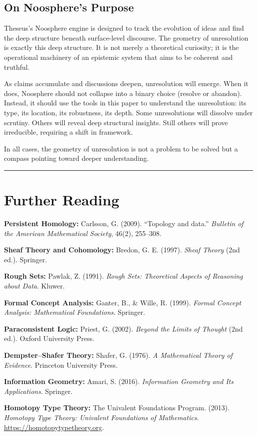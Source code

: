 \documentclass[11pt,letterpaper]{article}
\theoremstyle{definition}
\theoremstyle{remark}
\begin{document}
\subsection*{On Noosphere's Purpose}

Theseus's Noosphere engine is designed to track the evolution of ideas and find the deep structure beneath surface-level discourse. The geometry of unresolution is exactly this deep structure. It is not merely a theoretical curiosity; it is the operational machinery of an epistemic system that aims to be coherent and truthful.

As claims accumulate and discussions deepen, unresolution will emerge. When it does, Noosphere should not collapse into a binary choice (resolve or abandon). Instead, it should use the tools in this paper to understand the unresolution: its type, its location, its robustness, its depth. Some unresolutions will dissolve under scrutiny. Others will reveal deep structural insights. Still others will prove irreducible, requiring a shift in framework.

In all cases, the geometry of unresolution is not a problem to be solved but a compass pointing toward deeper understanding.

\vspace{1cm}
\begin{center}
\rule{3cm}{0.4pt}
\end{center}

\appendix

\section{Further Reading}

\textbf{Persistent Homology:}
Carlsson, G. (2009). ``Topology and data.'' \textit{Bulletin of the American Mathematical Society}, 46(2), 255--308.

\textbf{Sheaf Theory and Cohomology:}
Bredon, G. E. (1997). \textit{Sheaf Theory} (2nd ed.). Springer.

\textbf{Rough Sets:}
Pawlak, Z. (1991). \textit{Rough Sets: Theoretical Aspects of Reasoning about Data}. Kluwer.

\textbf{Formal Concept Analysis:}
Ganter, B., \& Wille, R. (1999). \textit{Formal Concept Analysis: Mathematical Foundations}. Springer.

\textbf{Paraconsistent Logic:}
Priest, G. (2002). \textit{Beyond the Limits of Thought} (2nd ed.). Oxford University Press.

\textbf{Dempster--Shafer Theory:}
Shafer, G. (1976). \textit{A Mathematical Theory of Evidence}. Princeton University Press.

\textbf{Information Geometry:}
Amari, S. (2016). \textit{Information Geometry and Its Applications}. Springer.

\textbf{Homotopy Type Theory:}
The Univalent Foundations Program. (2013). \textit{Homotopy Type Theory: Univalent Foundations of Mathematics}. \url{https://homotopytypetheory.org}.

\vspace{0.5cm}
\end{document}
